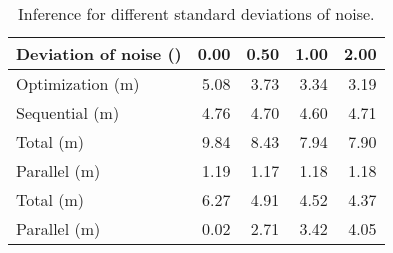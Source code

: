 \begin{table*}
  \centering
  \caption{Inference for different standard deviations of noise.}
  \ttfamily
  \begin{tabular}{lrrrr}
    \toprule
    \textnormal{Deviation of noise (\celsius{})} & 0.00 & 0.50 & 1.00 & 2.00 \\
    \midrule
    \textnormal{Optimization (m)}                & 5.08 & 3.73 & 3.34 & 3.19 \\
    \midrule
    \textnormal{Sequential (m)}                  & 4.76 & 4.70 & 4.60 & 4.71 \\
    \textnormal{Total (m)}                       & 9.84 & 8.43 & 7.94 & 7.90 \\
    \midrule
    \textnormal{Parallel (m)}                    & 1.19 & 1.17 & 1.18 & 1.18 \\
    \textnormal{Total (m)}                       & 6.27 & 4.91 & 4.52 & 4.37 \\
    \midrule
    \textnormal{Parallel (m)}                    & 0.02 & 2.71 & 3.42 & 4.05 \\
    \bottomrule
  \end{tabular}
\end{table*}
